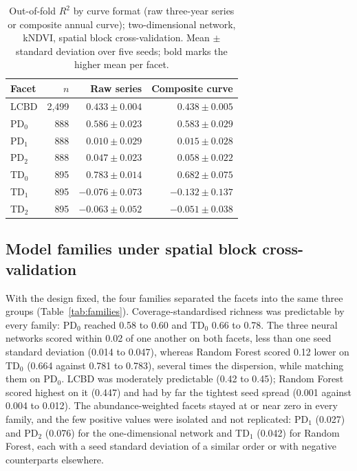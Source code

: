 \documentclass[preprint,12pt]{elsarticle}
\begin{document}
\begin{table}[t]
\centering
\footnotesize
\caption{Out-of-fold $R^2$ by curve format (raw three-year series or composite annual
curve); two-dimensional network, kNDVI, spatial block cross-validation. Mean $\pm$ standard
deviation over five seeds; bold marks the higher mean per facet.}
\label{tab:curveformat}
\begin{tabular}{lrrr}
\toprule
Facet & $n$ & Raw series & Composite curve \\
\midrule
LCBD   & 2,499 & $0.433\pm0.004$ & $\mathbf{0.438\pm0.005}$ \\
PD$_0$ & 888   & $\mathbf{0.586\pm0.023}$ & $0.583\pm0.029$ \\
PD$_1$ & 888   & $0.010\pm0.029$ & $\mathbf{0.015\pm0.028}$ \\
PD$_2$ & 888   & $0.047\pm0.023$ & $\mathbf{0.058\pm0.022}$ \\
TD$_0$ & 895   & $\mathbf{0.783\pm0.014}$ & $0.682\pm0.075$ \\
TD$_1$ & 895   & $\mathbf{-0.076\pm0.073}$ & $-0.132\pm0.137$ \\
TD$_2$ & 895   & $\mathbf{-0.063\pm0.052}$ & $-0.051\pm0.038$ \\
\bottomrule
\end{tabular}
\end{table}

\subsection{Model families under spatial block cross-validation}
\label{sec:results_families}

With the design fixed, the four families separated the facets into the same three groups
(Table~\ref{tab:families}). Coverage-standardised richness was predictable by every family:
PD$_0$ reached 0.58 to 0.60 and TD$_0$ 0.66 to 0.78. The three neural networks scored within
0.02 of one another on both facets, less than one seed standard deviation (0.014 to 0.047),
whereas Random Forest scored 0.12 lower on TD$_0$ (0.664 against 0.781 to 0.783), several
times the dispersion, while matching them on PD$_0$. LCBD was moderately predictable (0.42
to 0.45); Random Forest scored highest on it (0.447) and had by far the tightest seed
spread (0.001 against 0.004 to 0.012). The abundance-weighted facets stayed at or near zero
in every family, and the few positive values were isolated and not replicated: PD$_1$
(0.027) and PD$_2$ (0.076) for the one-dimensional network and TD$_1$ (0.042) for Random
Forest, each with a seed standard deviation of a similar order or with negative
counterparts elsewhere.
\end{document}
